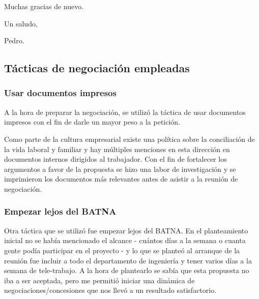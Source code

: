 \begin{displayquote}
{  \par Muchas gracias de nuevo.
  \par Un saludo,
  \par Pedro.}
\end{displayquote}
\subsection{Tácticas de negociación empleadas}
\subsubsection{Usar documentos impresos}
\par A la hora de preparar la negociación, se utilizó la táctica de usar documentos impresos con el fin de darle un mayor peso a la petición.
\par Como parte de la cultura empresarial existe una política sobre la conciliación de la vida laboral y familiar y hay múltiples menciones en esta dirección en documentos internos dirigidos al trabajador. Con el fin de fortalecer los argumentos a favor de la propuesta se hizo una labor de investigación y se imprimieron los documentos más relevantes antes de asistir a la reunión de negociación.
\subsubsection{Empezar lejos del BATNA}
\par Otra táctica que se utilizó fue empezar lejos del BATNA. En el planteamiento inicial no se había mencionado el alcance - cuántos días a la semana o cuanta gente podía participar en el proyecto - y lo que se planteó al arranque de la reunión fue incluir a todo el departamento de ingeniería y tener varios días a la semana de tele-trabajo. A la hora de plantearlo se sabía que esta propuesta no iba a ser aceptada, pero me permitió iniciar una dinámica de negociaciones/concesiones que nos llevó a un resultado satisfactorio.

